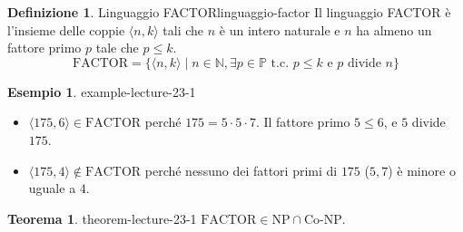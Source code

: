 \documentclass[a4paper]{article}
\theoremstyle{definition} %
\newtheorem{theorem}{Teorema}
\newtheorem{definition}{Definizione}
\newtheorem{example}{Esempio}
\begin{document}
\begin{definition}{Linguaggio FACTOR}{linguaggio-factor}
Il linguaggio FACTOR è l'insieme delle coppie $\langle n, k \rangle$ tali che $n$ è un intero naturale e $n$ ha almeno un fattore primo $p$ tale che $p \le k$.
\[
\text{FACTOR} = \{ \langle n, k \rangle \mid n \in \mathbb{N}, \exists p \in \mathbb{P} \text{ t.c. } p \le k \text{ e } p \text{ divide } n \}
\]
\end{definition}

\begin{example}{}{{ example-lecture-23-1 }}
\begin{itemize}
    \item $\langle 175, 6 \rangle \in \text{FACTOR}$ perché $175 = 5 \cdot 5 \cdot 7$. Il fattore primo $5 \le 6$, e $5$ divide $175$.
    \item $\langle 175, 4 \rangle \notin \text{FACTOR}$ perché nessuno dei fattori primi di $175$ ($5, 7$) è minore o uguale a $4$.
\end{itemize}
\end{example}

\begin{theorem}{}{{ theorem-lecture-23-1 }}
$\text{FACTOR} \in \text{NP} \cap \text{Co-NP}$.
\end{theorem}
\end{document}
